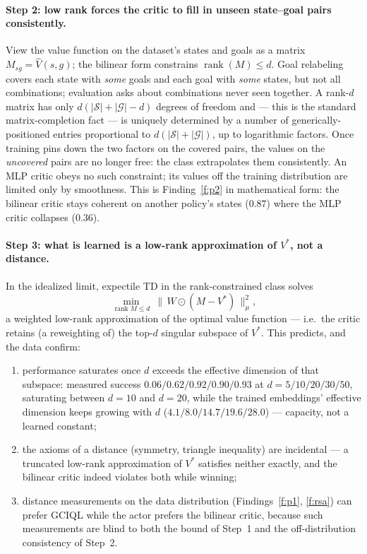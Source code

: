 \documentclass[10pt]{article}
\begin{document}
\paragraph{Step 2: low rank forces the critic to fill in unseen state--goal pairs
consistently.}
View the value function on the dataset's states and goals as a matrix
$M_{sg}=\hat V(s,g)$; the bilinear form constrains $\operatorname{rank}(M)\le d$.
Goal relabeling covers each state with \emph{some} goals and each goal with \emph{some}
states, but not all combinations; evaluation asks about combinations never seen together.
A rank-$d$ matrix has only $d(|\mathcal S|+|\mathcal G|-d)$ degrees of freedom and ---
this is the standard matrix-completion fact --- is uniquely determined by a number of
generically-positioned entries proportional to $d(|\mathcal S|+|\mathcal G|)$, up to
logarithmic factors. Once training pins down the two factors on the covered pairs, the
values on the \emph{uncovered} pairs are no longer free: the class extrapolates them
consistently. An MLP critic obeys no such constraint; its values off the training
distribution are limited only by smoothness. This is Finding~\ref{f:p2} in mathematical
form: the bilinear critic stays coherent on another policy's states ($0.87$) where the
MLP critic collapses ($0.36$).

\paragraph{Step 3: what is learned is a low-rank approximation of $V^*$, not a
distance.}
In the idealized limit, expectile TD in the rank-constrained class solves
\[
\min_{\operatorname{rank} M\le d}\ \big\|\,W\odot(M-V^*)\,\big\|_{\mu}^2 ,
\]
a weighted low-rank approximation of the optimal value function --- i.e.\ the critic
retains (a reweighting of) the top-$d$ singular subspace of $V^*$. This predicts, and the
data confirm:
\begin{enumerate}[label=(\roman*)]
\item performance saturates once $d$ exceeds the effective dimension of that subspace:
measured success $0.06/0.62/0.92/0.90/0.93$ at $d=5/10/20/30/50$, saturating between
$d=10$ and $d=20$, while the trained embeddings' effective dimension keeps growing with
$d$ ($4.1/8.0/14.7/19.6/28.0$) --- capacity, not a learned constant;
\item the axioms of a distance (symmetry, triangle inequality) are incidental --- a
truncated low-rank approximation of $V^*$ satisfies neither exactly, and the bilinear
critic indeed violates both while winning;
\item distance measurements on the data distribution (Findings~\ref{f:p1},
\ref{f:rsa}) can prefer GCIQL while the actor prefers the bilinear critic, because such
measurements are blind to both the bound of Step~1 and the off-distribution consistency
of Step~2.
\end{enumerate}
\end{document}
